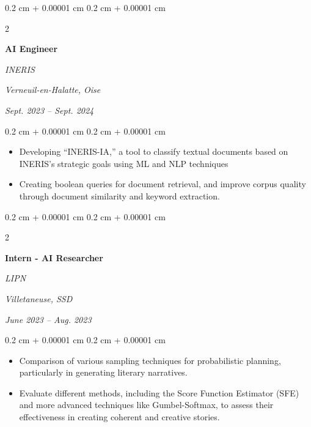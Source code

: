 \documentclass[10pt, letterpaper]{article}
\newenvironment{highlights}{
    \begin{itemize}[
        topsep=0.10 cm,
        parsep=0.10 cm,
        partopsep=0pt,
        itemsep=0pt,
        leftmargin=0.4 cm + 10pt
    ]
}{
    \end{itemize}
} %
\newenvironment{onecolentry}{
    \begin{adjustwidth}{
        0.2 cm + 0.00001 cm
    }{
        0.2 cm + 0.00001 cm
    }
}{
    \end{adjustwidth}
} %
\newenvironment{twocolentry}[2][]{
    \onecolentry
    \def\secondColumn{#2}
    \setcolumnwidth{\fill, 4.5 cm}
    \begin{paracol}{2}
}{
    \switchcolumn \raggedleft \secondColumn
    \end{paracol}
    \endonecolentry
} %
\begin{document}
        \begin{twocolentry}{
            \textit{Verneuil-en-Halatte, Oise}    
                
            \textit{Sept. 2023 – Sept. 2024}}
                \textbf{AI Engineer}
                
                \textit{INERIS}
        \end{twocolentry} 
        \vspace{0.10 cm}
        \begin{onecolentry}
            \begin{highlights}
                \item Developing “INERIS-IA,” a tool to classify textual documents based on INERIS’s strategic goals using ML and NLP techniques
                \item Creating boolean queries for document retrieval, and improve corpus quality through document similarity and keyword extraction.
            \end{highlights}
        \end{onecolentry}
        \vspace{0.2 cm}


        \begin{twocolentry}{
            \textit{Villetaneuse, SSD}    
                
            \textit{June 2023 – Aug. 2023}}
                \textbf{Intern - AI Researcher}
                
                \textit{LIPN}
        \end{twocolentry}    
        \vspace{0.10 cm}
        \begin{onecolentry}
            \begin{highlights}
                \item Comparison of various sampling techniques for probabilistic planning, particularly in generating literary narratives.
                \item Evaluate different methods, including the Score Function Estimator (SFE) and more advanced techniques like Gumbel-Softmax, to assess their effectiveness in creating coherent and creative stories.
            \end{highlights}
        \end{onecolentry}

\end{document}
